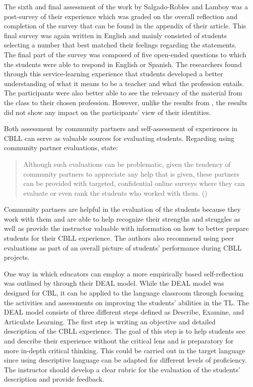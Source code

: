 \documentclass[output=paper]{langscibook}
\begin{document}
The sixth and final assessment of the work by Salgado-Robles and Lamboy was a post-survey of their experience which was graded on the overall reflection and completion of the survey that can be found in the appendix of their article. This final survey was again written in English and mainly consisted of students selecting a number that best matched their feelings regarding the statements. The final part of the survey was composed of five open-ended questions to which the students were able to respond in English or Spanish. The researchers found through this service-learning experience that students developed a better understanding of what it means to be a teacher and what the profession entails. The participants were also better able to see the relevancy of the material from the class to their chosen profession. However, unlike the results from \citet{LowtherPereira2015}, the results did not show any impact on the participants’ view of their identities.

Both assessment by community partners and self-assessment of experiences in CBLL can serve as valuable sources for evaluating students. Regarding using community partner evaluations, \citet{BrownThompson2018} state:

\begin{quote}
Although such evaluations can be problematic, given the tendency of community partners to appreciate any help that is given, these partners can be provided with targeted, confidential online surveys where they can evaluate or even rank the students who worked with them. (\citeyear[90]{BrownThompson2018})
\end{quote}

Community partners are helpful in the evaluation of the students because they work with them and are able to help recognize their strengths and struggles as well as provide the instructor valuable with information on how to better prepare students for their CBLL experience. The authors  also recommend using peer evaluations as part of an overall picture of students’ performance during CBLL projects.

One way in which educators can employ a more empirically based self-re\-flec\-tion was outlined by \citet{AshClayton2009} through their DEAL model. While the DEAL model was designed for CBL, it can be applied to the language classroom through focusing the activities and assessments on improving the students’ abilities in the TL. The DEAL model consists of three different steps defined as Describe, Examine, and Articulate Learning. The first step is writing an objective and detailed description of the CBLL experience. The goal of this step is to help students see and describe their experience without the critical lens and is preparatory for more in-depth critical thinking. This could be carried out in the target language since using descriptive language can be adapted for different levels of proficiency. The instructor should develop a clear rubric for the evaluation of the students’ description and provide feedback.
\end{document}
